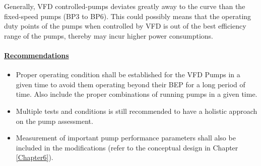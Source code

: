 Generally, VFD controlled-pumps deviates greatly away to the curve than the fixed-speed pumps (BP3 to BP6). This could possibly means that the operating duty points of the pumps when controlled by VFD is out of the best efficiency range of the pumps, thereby may incur higher power consumptions. 

\paragraph{\underline{Recommendations}}

\begin{itemize}
\item	Proper operating condition shall be established for the VFD Pumps in a given time to avoid them operating beyond their BEP for a long period of time. Also include the proper combinations of running pumps in a given time.
\item	Multiple tests and conditions is still recommended to have a holistic approach on the pump assessment.
\item	Measurement of important pump performance parameters shall also be included in the modifications (refer to the conceptual design in Chapter \ref{Chapter6}).
\end{itemize}


